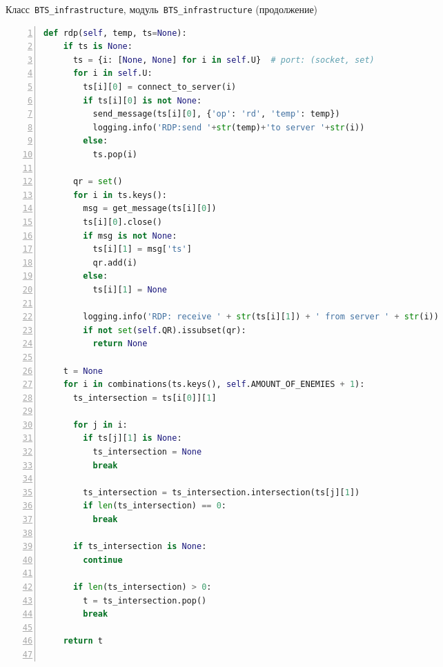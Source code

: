 \begin{ListingEnv}[p]\caption{Класс~\texttt{\small BTS_infrastructure}, модуль~\texttt{\small BTS_infrastructure} (продолжение)}\label{list:bts5}
	\begin{lstlisting}[language=Python, numbers=left]        
  def rdp(self, temp, ts=None):
    if ts is None:
      ts = {i: [None, None] for i in self.U}  # port: (socket, set)
      for i in self.U:
        ts[i][0] = connect_to_server(i)
        if ts[i][0] is not None:
          send_message(ts[i][0], {'op': 'rd', 'temp': temp})
          logging.info('RDP:send '+str(temp)+'to server '+str(i))
        else:
          ts.pop(i)
  
      qr = set()
      for i in ts.keys():
        msg = get_message(ts[i][0])
        ts[i][0].close()
        if msg is not None:
          ts[i][1] = msg['ts']
          qr.add(i)
        else:
          ts[i][1] = None
          
        logging.info('RDP: receive ' + str(ts[i][1]) + ' from server ' + str(i))
        if not set(self.QR).issubset(qr):
          return None
  
    t = None
    for i in combinations(ts.keys(), self.AMOUNT_OF_ENEMIES + 1):
      ts_intersection = ts[i[0]][1]
 
      for j in i:
        if ts[j][1] is None:
          ts_intersection = None
          break
          
        ts_intersection = ts_intersection.intersection(ts[j][1])
        if len(ts_intersection) == 0:
          break
  
      if ts_intersection is None:
        continue
  
      if len(ts_intersection) > 0:
        t = ts_intersection.pop()
        break
  
    return t
	
	\end{lstlisting}
\end{ListingEnv}


